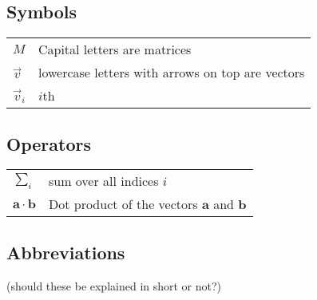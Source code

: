 
\subsection*{Symbols}

\begin{tabular}{ll}
$M$	& Capital letters are matrices\\
$\vec v$	& lowercase letters with arrows on top are vectors\\
$\vec v_i$	& $i$th 
\end{tabular}


\subsection*{Operators}

\begin{tabular}{ll}
$\sum_i $                        & sum over all indices $i$\\
$\mathbf{a} \cdot \mathbf{b}$    & Dot product of the vectors $\mathbf{a}$ and $\mathbf{b}$
\end{tabular}

\subsection*{Abbreviations}

(should these be explained in short or not?)

